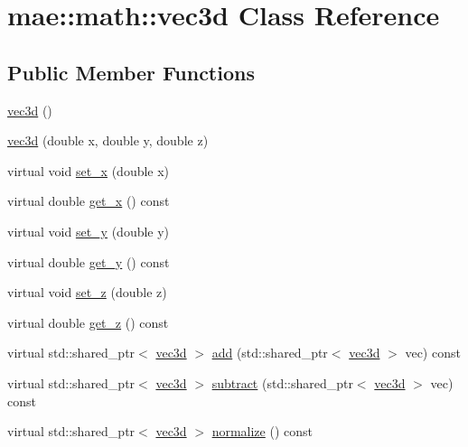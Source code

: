 \hypertarget{classmae_1_1math_1_1vec3d}{\section{mae\-:\-:math\-:\-:vec3d Class Reference}
\label{classmae_1_1math_1_1vec3d}
}
\subsection*{Public Member Functions}
\begin{DoxyCompactItemize}
\item 
\hyperlink{classmae_1_1math_1_1vec3d_a765884440bd75fb021f82a0b08342993}{vec3d} ()
\item 
\hyperlink{classmae_1_1math_1_1vec3d_a54c773be8273c8462df6ae790528ad90}{vec3d} (double x, double y, double z)
\item 
virtual void \hyperlink{classmae_1_1math_1_1vec3d_af152b95813c55f7136cd876df08da688}{set\-\_\-x} (double x)
\item 
virtual double \hyperlink{classmae_1_1math_1_1vec3d_a5ece2226e5d958b7d194b7011523cb45}{get\-\_\-x} () const 
\item 
virtual void \hyperlink{classmae_1_1math_1_1vec3d_acc4c161f86f5accfc477dc4eaa495477}{set\-\_\-y} (double y)
\item 
virtual double \hyperlink{classmae_1_1math_1_1vec3d_a42d97fc5d73175e3b48f3754491e2bbb}{get\-\_\-y} () const 
\item 
virtual void \hyperlink{classmae_1_1math_1_1vec3d_a2f447c43b1cce7f1e9d92a4a0632ff82}{set\-\_\-z} (double z)
\item 
virtual double \hyperlink{classmae_1_1math_1_1vec3d_a9597a58bdb1692d0a96bdb6e1368255e}{get\-\_\-z} () const 
\item 
virtual std\-::shared\-\_\-ptr$<$ \hyperlink{classmae_1_1math_1_1vec3d}{vec3d} $>$ \hyperlink{classmae_1_1math_1_1vec3d_a6cdd8d6e63078c444a048a4e68ae3819}{add} (std\-::shared\-\_\-ptr$<$ \hyperlink{classmae_1_1math_1_1vec3d}{vec3d} $>$ vec) const 
\item 
virtual std\-::shared\-\_\-ptr$<$ \hyperlink{classmae_1_1math_1_1vec3d}{vec3d} $>$ \hyperlink{classmae_1_1math_1_1vec3d_ab01f1ea5f0178f1d363df0d6f5465cab}{subtract} (std\-::shared\-\_\-ptr$<$ \hyperlink{classmae_1_1math_1_1vec3d}{vec3d} $>$ vec) const 
\item 
virtual std\-::shared\-\_\-ptr$<$ \hyperlink{classmae_1_1math_1_1vec3d}{vec3d} $>$ \hyperlink{classmae_1_1math_1_1vec3d_a3b96adb108c895bd488759ceecd40205}{normalize} () const 

\end{DoxyCompactItemize}
